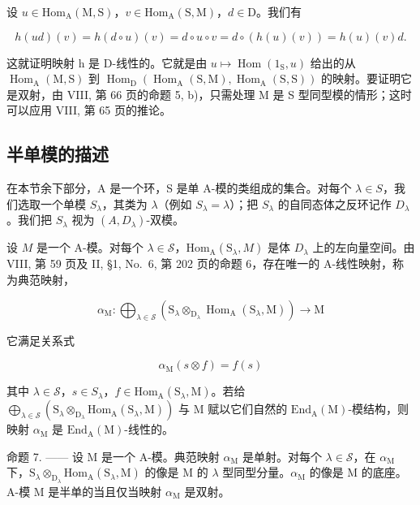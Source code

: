 设 \(u \in \mathrm{Hom}_{\mathrm{A}}(\mathrm{M}, \mathrm{S})\)，\(v \in \mathrm{Hom}_{\mathrm{A}}(\mathrm{S}, \mathrm{M})\)，\(d \in \mathrm{D}\)。我们有

\[
h (u d) (v) = h (d \circ u) (v) = d \circ u \circ v = d \circ (h (u) (v)) = h (u) (v) d.
\]

这就证明映射 h 是 D-线性的。它就是由 \(u \mapsto \operatorname{Hom}(1_{\mathrm{S}}, u)\) 给出的从 \(\operatorname{Hom}_{\mathrm{A}}(\mathrm{M}, \mathrm{S})\) 到 \(\operatorname{Hom}_{\mathrm{D}}(\operatorname{Hom}_{\mathrm{A}}(\mathrm{S}, \mathrm{M}), \operatorname{Hom}_{\mathrm{A}}(\mathrm{S}, \mathrm{S}))\) 的映射。要证明它是双射，由 VIII, 第 66 页的命题 5, b)，只需处理 M 是 S 型同型模的情形；这时可以应用 VIII, 第 65 页的推论。

\subsection{半单模的描述}

在本节余下部分，A 是一个环，S 是单 A-模的类组成的集合。对每个 \(\lambda \in S\)，我们选取一个单模 \(S_{\lambda}\)，其类为 \(\lambda\)（例如 \(S_{\lambda} = \lambda\)）；把 \(S_{\lambda}\) 的自同态体之反环记作 \(D_{\lambda}\)。我们把 \(S_{\lambda}\) 视为 \((A, D_{\lambda})\)-双模。

设 \(M\) 是一个 A-模。对每个 \(\lambda \in \mathcal{S}\)，\(\mathrm{Hom}_{\mathrm{A}}(\mathrm{S}_{\lambda}, M)\) 是体 \(D_{\lambda}\) 上的左向量空间。由 VIII, 第 59 页及 II, §1, No.~6, 第 202 页的命题 6，存在唯一的 A-线性映射，称为典范映射，

\[
\alpha_ {\mathrm{M}}: \bigoplus_ {\lambda \in \mathcal {S}} \left(\mathrm{S} _ {\lambda} \otimes_ {\mathrm{D} _ {\lambda}} \operatorname{Hom} _ {\mathrm{A}} (\mathrm{S} _ {\lambda}, \mathrm{M})\right) \to \mathrm{M}
\]

它满足关系式

\[
\alpha_ {\mathrm{M}} (s \otimes f) = f (s)\tag{10}
\]

其中 \(\lambda \in \mathcal{S}\)，\(s \in S_{\lambda}\)，\(f \in \mathrm{Hom}_{\mathrm{A}}(\mathrm{S}_{\lambda}, \mathrm{M})\)。若给 \(\bigoplus_{\lambda \in \mathcal{S}} (\mathrm{S}_{\lambda} \otimes_{\mathrm{D}_{\lambda}} \mathrm{Hom}_{\mathrm{A}}(\mathrm{S}_{\lambda}, \mathrm{M}))\) 与 \(\mathrm{M}\) 赋以它们自然的 \(\mathrm{End}_{\mathrm{A}}(\mathrm{M})\)-模结构，则映射 \(\alpha_{\mathrm{M}}\) 是 \(\mathrm{End}_{\mathrm{A}}(\mathrm{M})\)-线性的。

命题 7. —— 设 M 是一个 A-模。典范映射 \(\alpha_{\mathrm{M}}\) 是单射。对每个 \(\lambda \in \mathcal{S}\)，在 \(\alpha_{\mathrm{M}}\) 下，\(\mathrm{S}_{\lambda} \otimes_{\mathrm{D}_{\lambda}} \mathrm{Hom}_{\mathrm{A}}(\mathrm{S}_{\lambda}, \mathrm{M})\) 的像是 M 的 \(\lambda\) 型同型分量。\(\alpha_{\mathrm{M}}\) 的像是 M 的底座。A-模 M 是半单的当且仅当映射 \(\alpha_{\mathrm{M}}\) 是双射。

